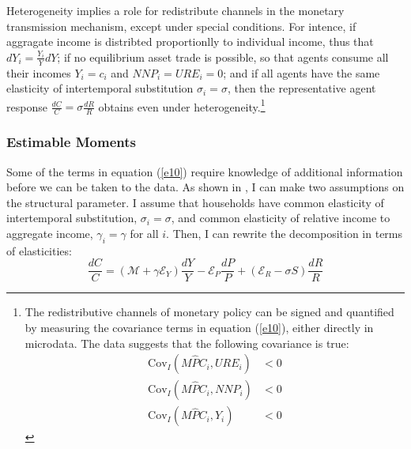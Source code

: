 \documentclass[11pt,letterpaper]{article}
\begin{document}
Heterogeneity implies a role for redistribute channels in the monetary transmission mechanism, except under special conditions. For intence, if aggragate income is distribted proportionlly to individual income, thus that $dY_{i} = \frac{Y_{i}}{Y}dY$; if no equilibrium asset trade is possible, so that agents consume all their incomes $Y_{i} = c_{i}$ and $NNP_{i} = URE_{i} = 0$; and if all agents have the same elasticity of intertemporal substitution $\sigma_{i} = \sigma$, then the representative agent response $\frac{dC}{C} = \sigma\frac{dR}{R}$ obtains even under heterogeneity.\footnote{The redistributive channels of monetary policy can be signed and quantified by measuring the covariance terms in equation (\ref{e10}), either directly in microdata. The data suggests that the following covariance is true:  
\begin{align*}
\label{e11} \mathrm{Cov}_{I} (M\widehat{P}C_{i}, URE_{i}) &< 0 \\
\label{e12} \mathrm{Cov}_{I} (M\widehat{P}C_{i}, NNP_{i}) &< 0 \\
\label{e13} \mathrm{Cov}_{I} (M\widehat{P}C_{i}, Y_{i}) &< 0
\end{align*}}
\subsubsection{Estimable Moments}

Some of the terms in equation (\ref{e10}) require knowledge of additional information before we can be taken to the data. As shown in \citet{Auclert2019}, I can make two assumptions on the structural parameter. I assume that households have common elasticity of intertemporal substitution, $\sigma_{i} = \sigma$, and common elasticity of relative income to aggregate income, $\gamma_{i} = \gamma$ for all $i$. Then, I can rewrite the decomposition in terms of elasticities:   
\begin{equation}\label{e18}
\frac{dC}{C} = ( \mathcal{M} + \gamma \mathcal{E}_{Y}) \frac{dY}{Y} - \mathcal{E}_{P} \frac{dP}{P} + (\mathcal{E}_{R} - \sigma S) \frac{dR}{R} 
\end{equation}
\end{document}

